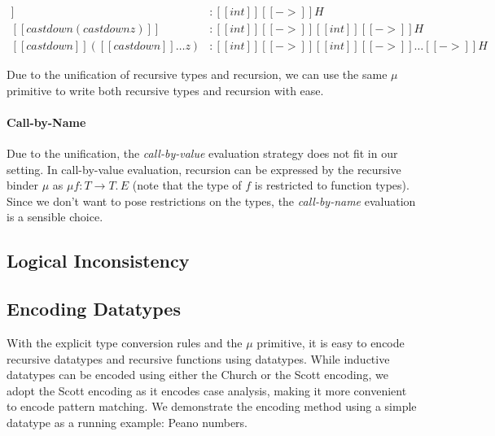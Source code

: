 \begin{align*}
[[castdown z]] &: [[int]][[->]]H  \\
[[castdown(castdown z)]] &: [[int]][[->]][[int]][[->]]H \\
[[castdown]]([[castdown]] \dots z) &: [[int]][[->]][[int]][[->]]\dots[[->]]H
\end{align*}

Due to the unification of recursive types and recursion, we can use
the same $\mu$ primitive to write both recursive types and recursion
with ease.

\paragraph{Call-by-Name}
Due to the unification, the \emph{call-by-value} evaluation strategy
does not fit in our setting. In call-by-value evaluation, recursion
can be expressed by the recursive binder $\mu$ as $\mu f : T
\rightarrow T.\, E$ (note that the type of $f$ is restricted to
function types). Since we don't want to pose restrictions on the
types, the \emph{call-by-name} evaluation is a sensible choice.

\subsection{Logical Inconsistency}

  

\subsection{Encoding Datatypes}


With the explicit type conversion rules and the $\mu$ primitive, it is
easy to encode recursive datatypes and recursive functions using
datatypes. While inductive datatypes can be encoded using either the
Church or the Scott encoding, we adopt the Scott encoding as it
encodes case analysis, making it more convenient to
encode pattern matching. We demonstrate the encoding method using a
simple datatype as a running example: Peano numbers.

